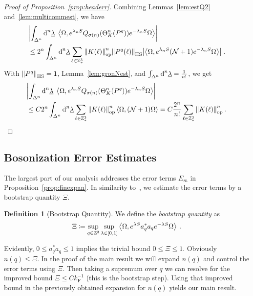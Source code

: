 \documentclass[12pt,a4paper]{article}
\numberwithin{equation}{section}
\newcommand{\ulambda}{\underline{\lambda}}
\newcommand{\1}{\mathbb{I}}
\newcommand{\di}{\textnormal{d}}
\newcommand{\F}{\mathrm{F}}
\newcommand{\HS}{\mathrm{HS}}
\newcommand{\kF}{k_\F}
\newcommand{\Z}{\mathbb{Z}}
\newcommand{\NN}{\mathcal{N}}
\newcommand{\eva}[1]{\left\langle #1 \right\rangle}
\theoremstyle{plain}
\theoremstyle{definition}
\newtheorem{definition}[theorem]{Definition}
\theoremstyle{remark}
\theoremstyle{plain}
\theoremstyle{definition}
\theoremstyle{remark}
\begin{document}
\begin{proof}[Proof of Proposition~\ref{prop:headerr}]
Combining Lemmas~\ref{lem:estQ2} and~\ref{lem:multicommest}, we have
\begin{align}
	&\abs{\int_{\Delta^n} \di^n \ulambda \;
		\eva{\Omega, e^{\lambda_n S} Q_{\sigma(n)}(\Theta^n_{K}(P^q)) e^{-\lambda_n S} \Omega} } \nonumber\\
	&\leq 2^n \int_{\Delta^n} \di^n \ulambda \sum_{\ell \in \Z^3_*} \norm{K(\ell)}^n_{\mathrm{op}} \norm{P^q(\ell)}_{\HS} 
		\abs{\eva{\Omega, e^{\lambda_n S} (\NN +1) e^{-\lambda_n S} \Omega}} \;.
\end{align}
With $ \norm{P^q}_{\HS} = 1$, Lemma~\ref{lem:gronNest}, and $ \int_{\Delta^n} \di^n\underline{\lambda} = \frac{1}{n!} $, we get
\begin{align*}
	&\abs{\int_{\Delta^n} \di^n \ulambda \;
		\eva{\Omega, e^{\lambda_n S} Q_{\sigma(n)}(\Theta^n_{K}(P^q)) e^{-\lambda_n S} \Omega} }
	\\
	& \leq C 2^n \int_{\Delta^n} \di^n \ulambda \sum_{\ell \in \Z^3_*} \norm{K(\ell)}^n_{\mathrm{op}} \eva{\Omega,(\NN+1)\Omega} =  C \frac{2^n}{n!} \sum_{\ell \in \Z^3_*} \norm{K(\ell)}^n_{\mathrm{op}} \;. \qedhere
\end{align*}
\end{proof}






\subsection{Bosonization Error Estimates}
\label{subsec:bos_error}

The largest part of our analysis addresses the error terms $ E_m $ in Proposition~\ref{prop:finexpan}. In similarity to~\cite{BL25}, we estimate the error terms by a  bootstrap quantity $ \Xi $.

\begin{definition}[Bootstrap Quantity] We define the \emph{bootstrap quantity} as
\begin{equation} \label{eq:Xi}
	\Xi \coloneq \sup\limits_{q \in \Z^3} \sup\limits_{\lambda \in [0,1]}\expval{\Omega, e^{\lambda S} a^*_q a_q e^{-\lambda S} \Omega} \;.
\end{equation}
\end{definition}

Evidently, $ 0 \le a_q^* a_q \le 1 $ implies the trivial bound $ 0 \le \Xi \le 1 $. Obviously $n(q) \leq \Xi$. In the proof of the main result we will expand $n(q)$ and control the error terms using $\Xi$. Then taking a supremum over $q$ we can resolve for the improved bound $\Xi \leq C \kF^{-1}$ (this is the bootstrap step). Using that improved bound in the previously obtained expansion for $n(q)$ yields our main result.
\end{document}
